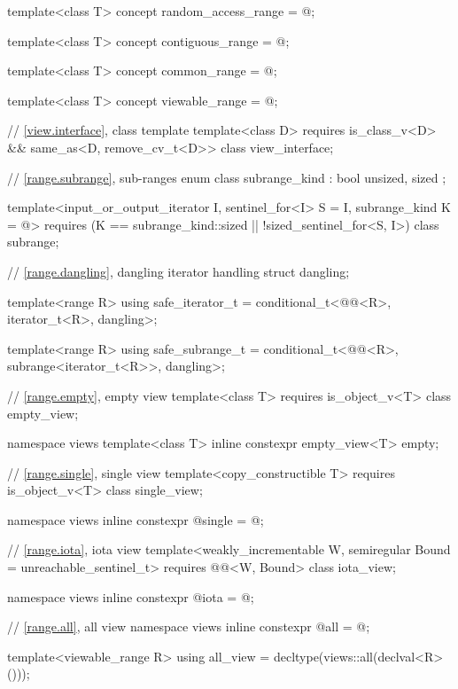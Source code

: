 \begin{codeblock}
{  template<class T>
    concept random_access_range = @\seebelow@;

  template<class T>
    concept contiguous_range = @\seebelow@;

  template<class T>
    concept common_range = @\seebelow@;

  template<class T>
    concept viewable_range = @\seebelow@;

  // \ref{view.interface}, class template 
  template<class D>
    requires is_class_v<D> && same_as<D, remove_cv_t<D>>
  class view_interface;

  // \ref{range.subrange}, sub-ranges
  enum class subrange_kind : bool { unsized, sized };

  template<input_or_output_iterator I, sentinel_for<I> S = I, subrange_kind K = @\seebelow@>
    requires (K == subrange_kind::sized || !sized_sentinel_for<S, I>)
  class subrange;

  // \ref{range.dangling}, dangling iterator handling
  struct dangling;

  template<range R>
    using safe_iterator_t = conditional_t<@@<R>, iterator_t<R>, dangling>;

  template<range R>
    using safe_subrange_t =
      conditional_t<@@<R>, subrange<iterator_t<R>>, dangling>;

  // \ref{range.empty}, empty view
  template<class T>
    requires is_object_v<T>
  class empty_view;

  namespace views {
    template<class T>
      inline constexpr empty_view<T> empty{};
  }

  // \ref{range.single}, single view
  template<copy_constructible T>
    requires is_object_v<T>
  class single_view;

  namespace views { inline constexpr @\unspec@ single = @\unspec@; }

  // \ref{range.iota}, iota view
  template<weakly_incrementable W, semiregular Bound = unreachable_sentinel_t>
    requires @@<W, Bound>
  class iota_view;

  namespace views { inline constexpr @\unspec@ iota = @\unspec@; }

  // \ref{range.all}, all view
  namespace views { inline constexpr @\unspec@ all = @\unspec@; }

  template<viewable_range R>
    using all_view = decltype(views::all(declval<R>()));

}
\end{codeblock}
